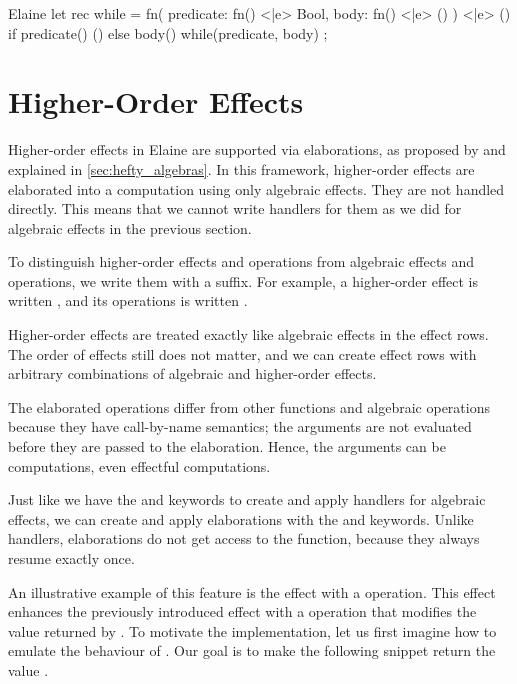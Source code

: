 \begin{lst}{Elaine}
let rec while = fn(
    predicate: fn() <|e> Bool,
    body: fn() <|e> ()
) <|e> (){
    if predicate() {
        ()
    } else {
        body()
        while(predicate, body)
    }
};
\end{lst}
%
\section{Higher-Order Effects}\label{sec:hoeffects}

Higher-order effects in Elaine are supported via elaborations, as proposed by \textcite{bach_poulsen_hefty_2023} and explained in \cref{sec:hefty_algebras}. In this framework, higher-order effects are elaborated into a computation using only algebraic effects. They are not handled directly. This means that we cannot write handlers for them as we did for algebraic effects in the previous section.

To distinguish higher-order effects and operations from algebraic effects and operations, we write them with a \el{!} suffix. For example, a higher-order  effect is written , and its  operations is written .

Higher-order effects are treated exactly like algebraic effects in the effect rows. The order of effects still does not matter, and we can create effect rows with arbitrary combinations of algebraic and higher-order effects.

The elaborated operations differ from other functions and algebraic operations because they have call-by-name semantics; the arguments are not evaluated before they are passed to the elaboration. Hence, the arguments can be computations, even effectful computations.

Just like we have the  and  keywords to create and apply handlers for algebraic effects, we can create and apply elaborations with the  and  keywords. Unlike handlers, elaborations do not get access to the  function, because they always resume exactly once.

An illustrative example of this feature is the  effect with a  operation. This effect enhances the previously introduced  effect with a  operation that modifies the value returned by . To motivate the implementation, let us first imagine how to emulate the behaviour of . Our goal is to make the following snippet return the value .

